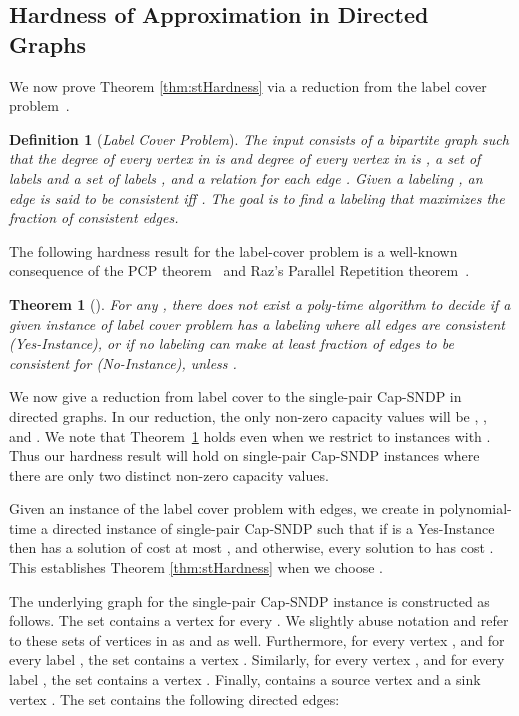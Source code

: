 \documentclass[11pt]{article}
\newcounter{thm0Rcopies}
\newcounter{thm_saved}
\newtheorem{theorem}[lemma]{Theorem}
\newtheorem{definition}[lemma]{Definition}
\newcommand{\yes}{{\sc Yes-Instance}\xspace}
\newcommand{\no}{{\sc No-Instance}\xspace}
\begin{document}
\subsection{Hardness of Approximation in Directed Graphs}
\label{subsec:stHardness}

We now prove Theorem \ref{thm:stHardness} via a reduction from the label
cover problem~\cite{ABSS}.

\begin{definition} [{\em Label Cover Problem}]
  The input consists of a bipartite graph  such that the degree
  of every vertex in  is  and degree of every vertex in  is
  ,  a set of labels  and a set of labels , and  a
  relation  for each
  edge .  Given a labeling ,
  an edge  is said to be {\em consistent} iff
  . The goal is to find a
  labeling that maximizes the fraction of consistent edges.
\end{definition}

The following hardness result for the label-cover problem is a well-known
consequence of the PCP theorem~\cite{ALMSS} and Raz's Parallel Repetition
theorem~\cite{Raz98}.

\begin{theorem}[{\rm \cite{ALMSS,Raz98}}]
\label{thm:labelcover_hard}
For any , there does not exist a poly-time algorithm
to decide if a given instance of label cover problem
has a labeling where all edges are consistent {\rm (\yes)}, or
if no labeling can make at least  fraction
of edges to be consistent for  {\rm (\no)},
unless .
\end{theorem}

We now give a reduction from label cover
to the single-pair Cap-SNDP in directed graphs. 
In our reduction, the only non-zero capacity values will be , , and . 
We note that Theorem~\ref{thm:labelcover_hard} holds even when we restrict 
to instances with . Thus our hardness result will hold on single-pair Cap-SNDP
instances where there are only two distinct non-zero capacity values.


Given an instance 
of the label cover problem with  edges, we create in polynomial-time a directed
instance  of single-pair Cap-SNDP such that if  is a \yes
then  has a solution of cost at most , and otherwise,
every solution to  has cost
. This establishes Theorem \ref{thm:stHardness}
when we choose .

The underlying graph  for the single-pair Cap-SNDP instance
is constructed as follows.  The set  contains a vertex  for every
. We slightly abuse notation and refer to
these sets of vertices in  as  and  as well.
Furthermore, for every vertex , and for every label , the set  contains a vertex . Similarly, for every vertex , and for every label , the set  contains a vertex
. Finally,  contains  a source vertex  and a sink vertex .
The set  contains the following directed edges:
\end{document}
